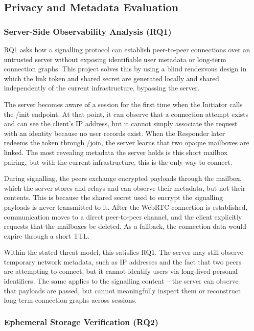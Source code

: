 \documentclass[12pt,a4paper]{article}
\begin{document}
\subsection{Privacy and Metadata Evaluation}

\subsubsection{Server-Side Observability Analysis (RQ1)}

RQ1 asks how a signalling protocol can establish peer-to-peer connections over an untrusted server without exposing identifiable user metadata or long-term connection graphs. This project solves this by using a blind rendezvous design in which the link token and shared secret are generated locally and shared independently of the current infrastructure, bypassing the server.

The server becomes aware of a session for the first time when the Initiator calls the /init endpoint. At that point, it can observe that a connection attempt exists and can see the client’s IP address, but it cannot simply associate the request with an identity because no user records exist. When the Responder later redeems the token through /join, the server learns that two opaque mailboxes are linked. The most revealing metadata the server holds is this short mailbox pairing, but with the current infrastructure, this is the only way to connect.

During signalling, the peers exchange encrypted payloads through the mailbox, which the server stores and relays and can observe their metadata, but not their contents. This is because the shared secret used to encrypt the signalling payloads is never transmitted to it. After the WebRTC connection is established, communication moves to a direct peer-to-peer channel, and the client explicitly requests that the mailboxes be deleted. As a fallback, the connection data would expire through a short TTL.

Within the stated threat model, this satisfies RQ1. The server may still observe temporary network metadata, such as IP addresses and the fact that two peers are attempting to connect, but it cannot identify users via long-lived personal identifiers. The same applies to the signalling content – the server can observe that payloads are passed, but cannot meaningfully inspect them or reconstruct long-term connection graphs across sessions.

\subsubsection{Ephemeral Storage Verification (RQ2)}
\end{document}
